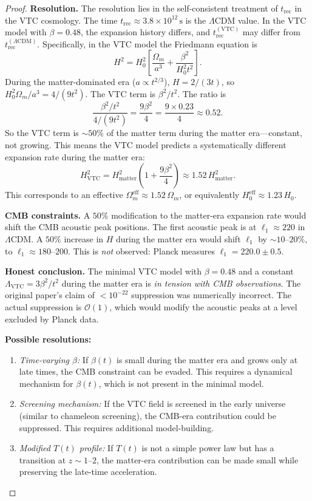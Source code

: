 \documentclass[11pt,a4paper]{article}
\theoremstyle{definition}
\newcommand{\eff}{\mathrm{eff}}
\newcommand{\VTC}{\mathrm{VTC}}
\newcommand{\rec}{\mathrm{rec}}
\begin{document}
\begin{proof}
\textbf{Resolution.} The resolution lies in the self-consistent treatment of $t_{\rec}$ in the VTC cosmology. The time $t_{\rec} \approx 3.8\times 10^{12}\,\mathrm{s}$ is the $\Lambda$CDM value. In the VTC model with $\beta = 0.48$, the expansion history differs, and $t_{\rec}^{(\VTC)}$ may differ from $t_{\rec}^{(\Lambda\mathrm{CDM})}$. Specifically, in the VTC model the Friedmann equation is
\begin{equation}
H^2 = H_0^2\left[\frac{\Omega_m}{a^3} + \frac{\beta^2}{H_0^2 t^2}\right].
\end{equation}
During the matter-dominated era ($a \propto t^{2/3}$), $H = 2/(3t)$, so $H_0^2\Omega_m/a^3 = 4/(9t^2)$. The VTC term is $\beta^2/t^2$. The ratio is
\begin{equation}
\frac{\beta^2/t^2}{4/(9t^2)} = \frac{9\beta^2}{4} = \frac{9\times 0.23}{4} \approx 0.52.
\end{equation}
So the VTC term is $\sim 50\%$ of the matter term during the matter era---constant, not growing. This means the VTC model predicts a systematically different expansion rate during the matter era:
\begin{equation}
H_{\VTC}^2 = H_{\mathrm{matter}}^2\left(1 + \frac{9\beta^2}{4}\right) \approx 1.52\,H_{\mathrm{matter}}^2.
\end{equation}
This corresponds to an effective $\Omega_m^{\eff} \approx 1.52\,\Omega_m$, or equivalently $H_0^{\eff} \approx 1.23\,H_0$.

\textbf{CMB constraints.} A $50\%$ modification to the matter-era expansion rate would shift the CMB acoustic peak positions. The first acoustic peak is at $\ell_1 \approx 220$ in $\Lambda$CDM. A $50\%$ increase in $H$ during the matter era would shift $\ell_1$ by $\sim 10$--$20\%$, to $\ell_1 \approx 180$--$200$. This is \textit{not} observed: Planck measures $\ell_1 = 220.0 \pm 0.5$.

\textbf{Honest conclusion.} The minimal VTC model with $\beta = 0.48$ and a constant $\Lambda_{\VTC} = 3\beta^2/t^2$ during the matter era is \textit{in tension with CMB observations}. The original paper's claim of $< 10^{-22}$ suppression was numerically incorrect. The actual suppression is $\mathcal{O}(1)$, which would modify the acoustic peaks at a level excluded by Planck data.

\textbf{Possible resolutions:}
\begin{enumerate}
    \item \textit{Time-varying $\beta$:} If $\beta(t)$ is small during the matter era and grows only at late times, the CMB constraint can be evaded. This requires a dynamical mechanism for $\beta(t)$, which is not present in the minimal model.
    \item \textit{Screening mechanism:} If the VTC field is screened in the early universe (similar to chameleon screening), the CMB-era contribution could be suppressed. This requires additional model-building.
    \item \textit{Modified $T(t)$ profile:} If $T(t)$ is not a simple power law but has a transition at $z \sim 1$--$2$, the matter-era contribution can be made small while preserving the late-time acceleration.
\end{enumerate}


\end{proof}
\end{document}
